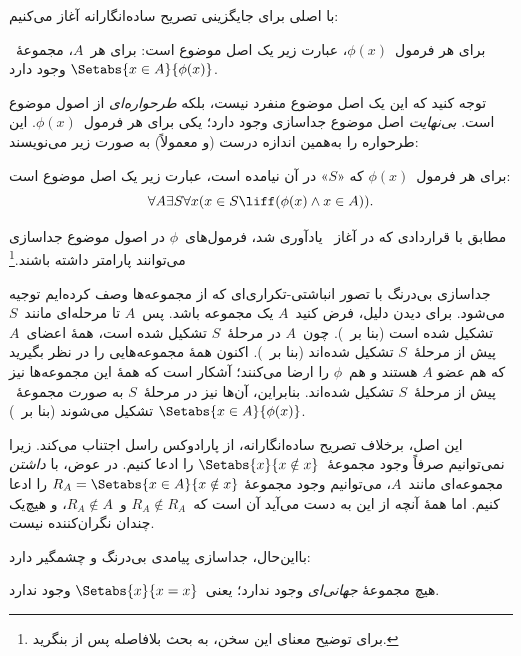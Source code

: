 \documentclass[../../../include/open-logic-section]{subfiles}
\begin{document}

با اصلی برای جایگزینی تصریح ساده‌انگارانه آغاز می‌کنیم:

\begin{axiom} برای هر فرمول~$\phi(x)$، عبارت زیر یک
اصل موضوع است: برای هر~$A$، مجموعهٔ~$\Setabs{x \in A}{\phi(x)}$ وجود دارد.
\end{axiom}

توجه کنید که این یک اصل موضوع منفرد نیست، بلکه \emph{طرحواره‌ای} از اصول
موضوع است. \emph{بی‌نهایت} اصل موضوع جداسازی وجود دارد؛ یکی برای هر
فرمول~$\phi(x)$. این طرحواره را به‌همین اندازه درست (و معمولاً) به صورت
زیر می‌نویسند:

\begin{defish}
برای هر فرمول~$\phi(x)$ که «$S$» در آن نیامده است، عبارت زیر یک اصل موضوع
است:
\[
	\forall A \exists S \forall x(x \in S \liff (\phi(x) \land x \in A)).
\]
\end{defish}

مطابق با قراردادی که در آغاز~ یادآوری شد،
فرمول‌های~$\phi$ در اصول موضوع جداسازی می‌توانند پارامتر داشته
باشند.\footnote{برای توضیح معنای این سخن، به بحث بلافاصله پس از
 بنگرید.}

جداسازی بی‌درنگ با تصور انباشتی-تکراری‌ای که از مجموعه‌ها وصف کرده‌ایم
توجیه می‌شود. برای دیدن دلیل، فرض کنید~$A$ یک مجموعه باشد. پس~$A$ تا
مرحله‌ای مانند~$S$ تشکیل شده است (بنا بر~\stageshier). چون~$A$ در
مرحلهٔ~$S$ تشکیل شده است، همهٔ اعضای~$A$ پیش از مرحلهٔ~$S$ تشکیل شده‌اند
(بنا بر~\stagesacc). اکنون همهٔ مجموعه‌هایی را در نظر بگیرید که هم عضو
$A$ هستند و هم~$\phi$ را ارضا می‌کنند؛ آشکار است که همهٔ این مجموعه‌ها
نیز پیش از مرحلهٔ~$S$ تشکیل شده‌اند. بنابراین، آن‌ها نیز در مرحلهٔ~$S$
به صورت مجموعهٔ~$\Setabs{x \in A}{\phi(x)}$ تشکیل می‌شوند (بنا
بر~\stagesacc).

این اصل، برخلاف تصریح ساده‌انگارانه، از پارادوکس راسل اجتناب می‌کند. زیرا
نمی‌توانیم صرفاً وجود مجموعهٔ~$\Setabs{x}{x \notin x}$ را ادعا کنیم. در
عوض، با \emph{داشتن} مجموعه‌ای مانند~$A$، می‌توانیم وجود مجموعهٔ
$R_A = \Setabs{x \in A}{x \notin x}$ را ادعا کنیم. اما همهٔ آنچه از این
به دست می‌آید آن است که~$R_A \notin R_A$ و~$R_A \notin A$، و هیچ‌یک
چندان نگران‌کننده نیست.

بااین‌حال، جداسازی پیامدی بی‌درنگ و چشمگیر دارد:

\begin{thm}
هیچ مجموعهٔ \emph{جهانی‌ای} وجود ندارد؛ یعنی~$\Setabs{x}{x = x}$ وجود ندارد.
\end{thm}
\end{document}
